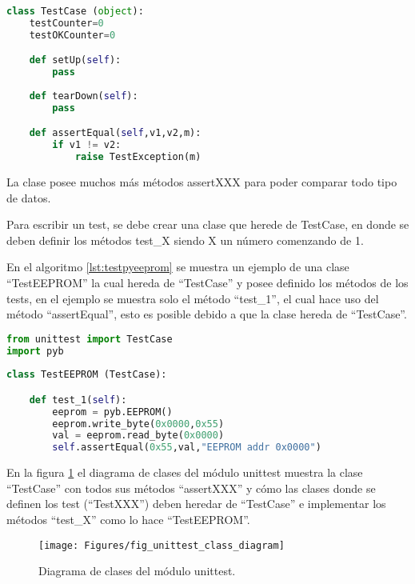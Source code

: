 \begin{lstlisting}[label={lst:testcase},caption=Clase TestCase utilizada para crear tests unitarios para Python., language={python}]
class TestCase (object):
    testCounter=0
    testOKCounter=0

    def setUp(self):
        pass
    
    def tearDown(self):
        pass

    def assertEqual(self,v1,v2,m):
        if v1 != v2:
            raise TestException(m)
\end{lstlisting}

La clase posee muchos más métodos assertXXX para poder comparar todo tipo de datos.

Para escribir un test, se debe crear una clase que herede de TestCase, en donde se deben definir los métodos test\_X siendo X un número comenzando de 1.

En el algoritmo \ref{lst:testpyeeprom} se muestra un ejemplo de una clase “TestEEPROM” la cual hereda de “TestCase” y posee definido los métodos de los tests, en el ejemplo se muestra solo el método “test\_1”, el cual hace uso del método “assertEqual”, esto es posible debido a que la clase hereda de “TestCase”.

\begin{lstlisting}[label={lst:testpyeeprom},caption=Clase que hereda de TestCase donde se definen los métodos de test para la EEPROM., language={python}]
from unittest import TestCase
import pyb
  
class TestEEPROM (TestCase):

    def test_1(self):
        eeprom = pyb.EEPROM()
        eeprom.write_byte(0x0000,0x55)
        val = eeprom.read_byte(0x0000)
        self.assertEqual(0x55,val,"EEPROM addr 0x0000")       
\end{lstlisting}

En la figura \ref{fig:unittestpythonclassd} el diagrama de clases del módulo unittest muestra la clase “TestCase” con todos sus métodos “assertXXX” y cómo las clases donde se definen los test (“TestXXX”) deben heredar de “TestCase” e implementar los métodos “test\_X” como lo hace “TestEEPROM”.

\begin{figure}[ht]
  \centering
    \texttt{[image: Figures/fig\_unittest\_class\_diagram]}
  \caption{Diagrama de clases del módulo unittest.}
  \label{fig:unittestpythonclassd}
\end{figure}


